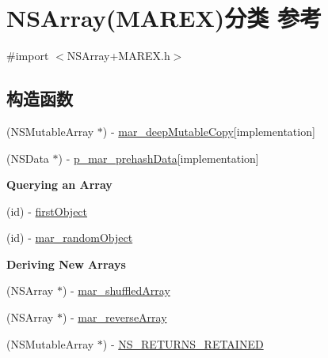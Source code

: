 \hypertarget{category_n_s_array_07_m_a_r_e_x_08}{}\section{N\+S\+Array(M\+A\+R\+EX)分类 参考}
\label{category_n_s_array_07_m_a_r_e_x_08}


{\ttfamily \#import $<$N\+S\+Array+\+M\+A\+R\+E\+X.\+h$>$}

\subsection*{构造函数}
\begin{DoxyCompactItemize}
\item 
(N\+S\+Mutable\+Array $\ast$) -\/ \hyperlink{category_n_s_array_07_m_a_r_e_x_08_a74f7e480b65a7ecdb44606c1fcc83158}{mar\+\_\+deep\+Mutable\+Copy}{\ttfamily  \mbox{[}implementation\mbox{]}}
\item 
(N\+S\+Data $\ast$) -\/ \hyperlink{category_n_s_array_07_m_a_r_e_x_08_af4f85cca4e9b7f35f80b67ba2e17f650}{p\+\_\+mar\+\_\+prehash\+Data}{\ttfamily  \mbox{[}implementation\mbox{]}}
\end{DoxyCompactItemize}
\begin{Indent}\textbf{ Querying an Array}\par
{\em 

 

 }\begin{DoxyCompactItemize}
\item 
(id) -\/ \hyperlink{category_n_s_array_07_m_a_r_e_x_08_a9bf191f60966aeec54edc1dcdbc9ea29}{first\+Object}
\item 
(id) -\/ \hyperlink{category_n_s_array_07_m_a_r_e_x_08_ac8f044b194d349e3bed622f90287eeb0}{mar\+\_\+random\+Object}
\end{DoxyCompactItemize}
\end{Indent}
\begin{Indent}\textbf{ Deriving New Arrays}\par
{\em 

 

 }\begin{DoxyCompactItemize}
\item 
(N\+S\+Array $\ast$) -\/ \hyperlink{category_n_s_array_07_m_a_r_e_x_08_af3e9feb3638dd6deaf32cb560fc4207f}{mar\+\_\+shuffled\+Array}
\item 
(N\+S\+Array $\ast$) -\/ \hyperlink{category_n_s_array_07_m_a_r_e_x_08_ac06e904985c9cb115219a1e91e1e2ca1}{mar\+\_\+reverse\+Array}
\item 
(N\+S\+Mutable\+Array $\ast$) -\/ \hyperlink{category_n_s_array_07_m_a_r_e_x_08_a99e0c3c24e69dd49e3f9b3fe8b207f8e}{N\+S\+\_\+\+R\+E\+T\+U\+R\+N\+S\+\_\+\+R\+E\+T\+A\+I\+N\+ED}
\end{DoxyCompactItemize}
\end{Indent}
